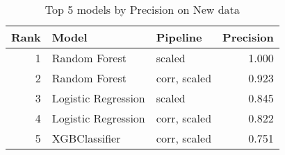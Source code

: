 \begin{table}[!htb]
\caption{Top 5 models by Precision on New data}
\label{table-top-5-precision-new}
\centering
\begin{tabular}{rllr}
\toprule
Rank & Model & Pipeline & Precision \\
\midrule
1 & Random Forest & scaled & 1.000 \\
2 & Random Forest & corr, scaled & 0.923 \\
3 & Logistic Regression & scaled & 0.845 \\
4 & Logistic Regression & corr, scaled & 0.822 \\
5 & XGBClassifier & corr, scaled & 0.751 \\
\bottomrule
\end{tabular}
\end{table}
